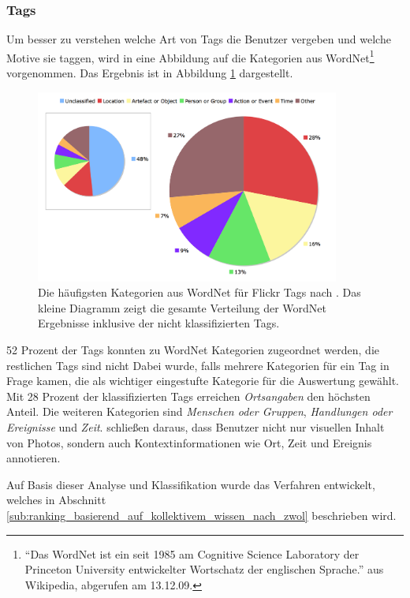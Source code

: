 \subsubsection*{Tags} %
\label{ssub:tags}


Um besser zu verstehen welche Art von Tags die Benutzer vergeben und welche Motive sie taggen, wird in \cite{collectiveKnowledge} eine Abbildung auf die Kategorien aus WordNet\footnote{``Das WordNet ist ein seit 1985 am Cognitive Science Laboratory der Princeton University entwickelter Wortschatz der englischen Sprache.'' aus Wikipedia, abgerufen am 13.12.09.} vorgenommen. Das Ergebnis ist in Abbildung \ref{fig:collectiveKnowledge_word_net_categories} dargestellt.

\begin{figure}[htbp]
  \centering
    \includegraphics[height=2.5in]{images/collectiveKnowledge_word_net_categories.png}
  \caption{Die häufigsten Kategorien aus WordNet für Flickr Tags nach \cite{collectiveKnowledge}. Das kleine Diagramm zeigt die gesamte Verteilung der WordNet Ergebnisse inklusive der nicht klassifizierten Tags.}
  \label{fig:collectiveKnowledge_word_net_categories}
\end{figure}

52 Prozent der Tags konnten zu WordNet Kategorien zugeordnet werden, die restlichen Tags sind nicht  Dabei wurde, falls mehrere Kategorien für ein Tag in Frage kamen, die als wichtiger eingestufte Kategorie für die Auswertung gewählt. Mit 28 Prozent der klassifizierten Tags erreichen \emph{Ortsangaben} den höchsten Anteil. Die weiteren Kategorien sind \emph{Menschen oder Gruppen}, \emph{Handlungen oder Ereignisse} und \emph{Zeit}. \cite{collectiveKnowledge} schließen daraus, dass Benutzer nicht nur visuellen Inhalt von Photos, sondern auch Kontextinformationen wie Ort, Zeit und Ereignis annotieren.

Auf Basis dieser Analyse und Klassifikation wurde das Verfahren entwickelt, welches in Abschnitt \ref{sub:ranking_basierend_auf_kollektivem_wissen_nach_zwol} beschrieben wird.







